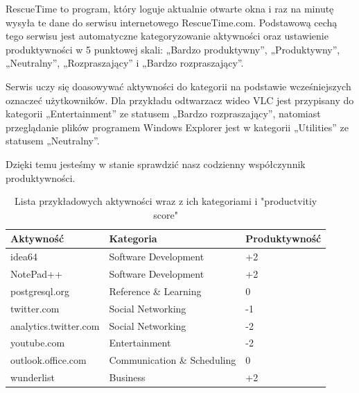 \documentclass[brudnopis]{xmgr}
\begin{document}

        RescueTime to program, który loguje aktualnie otwarte okna
        i raz na minutę wysyła te dane do serwisu internetowego RescueTime.com.
        Podstawową cechą tego serwisu jest automatyczne kategoryzowanie aktywności oraz ustawienie produktywności w 5 punktowej skali:
        „Bardzo produktywny”, „Produktywny”, „Neutralny”, „Rozpraszający” i „Bardzo rozpraszający”.

        Serwis uczy się doasowywać aktywności do kategorii na podstawie wcześniejszych oznaczeć użytkowników.
        Dla przykładu odtwarzacz wideo VLC jest przypisany do kategorii „Entertainment” ze statusem „Bardzo rozpraszający”,
        natomiast przeglądanie plików programem Windows Explorer jest w kategorii „Utilities” ze statusem „Neutralny”.

        Dzięki temu jesteśmy w stanie sprawdzić nasz codzienny współczynnik produktywności.

        \begin{table}[]
        \centering
        \caption{Lista przykładowych aktywności wraz z ich kategoriami i "productvitiy score"}
        \label{RescueTime - lista przykładowych aktywności}
        \begin{tabular}{lll}
        \hline
        \multicolumn{1}{l|}{Aktywność} & \multicolumn{1}{l|}{Kategoria} & Produktywność \\ \hline
        idea64                         & Software Development           & +2            \\
        NotePad++                      & Software Development           & +2            \\
        postgresql.org                 & Reference \& Learning          & 0             \\
        twitter.com                    & Social Networking              & -1            \\
        analytics.twitter.com          & Social Networking              & -2            \\
        youtube.com                    & Entertainment                  & -2            \\
        outlook.office.com             & Communication \& Scheduling    & 0             \\
        wunderlist                     & Business                       & +2
        \end{tabular}
        \end{table}
\end{document}
